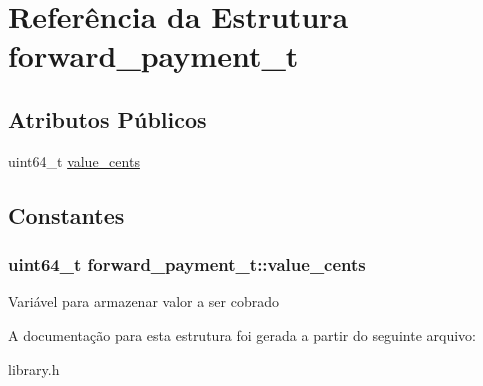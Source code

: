 \hypertarget{structforward__payment__t}{
\section{Referência da Estrutura forward\_\-payment\_\-t}
\label{structforward__payment__t}
}
\subsection*{Atributos Públicos}
\begin{DoxyCompactItemize}
\item 
uint64\_\-t \hyperlink{structforward__payment__t_a5dcfbf85626c49312281914693e904f7}{value\_\-cents}
\end{DoxyCompactItemize}


\subsection{Constantes}
\hypertarget{structforward__payment__t_a5dcfbf85626c49312281914693e904f7}{
\subsubsection[{value\_\-cents}]{\setlength{\rightskip}{0pt plus 5cm}uint64\_\-t {\bf forward\_\-payment\_\-t::value\_\-cents}}}
\label{structforward__payment__t_a5dcfbf85626c49312281914693e904f7}
Variável para armazenar valor a ser cobrado 

A documentação para esta estrutura foi gerada a partir do seguinte arquivo:\begin{DoxyCompactItemize}
\item 
library.h\end{DoxyCompactItemize}
